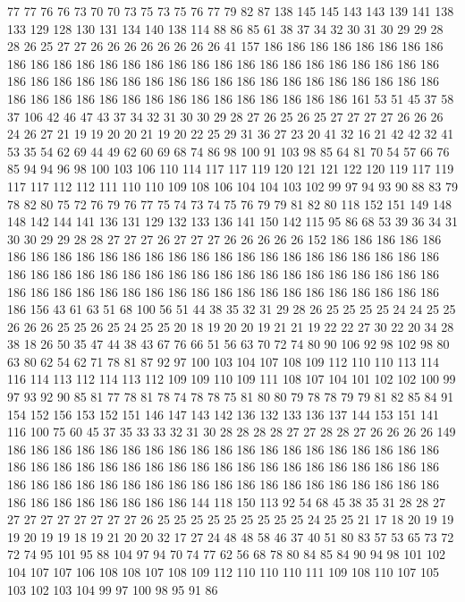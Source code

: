 77 77 76 76 73 70 70 73 75 73 75 76 77 79 82 87 138 145 145 143
143 139 141 138 133 129 128 130 131 134 140 138 114 88 86 85 61 38 37 34
32 30 31 30 29 29 28 28 26 25 27 27 26 26 26 26 26 26 26 26
41 157 186 186 186 186 186 186 186 186 186 186 186 186 186 186 186 186 186 186
186 186 186 186 186 186 186 186 186 186 186 186 186 186 186 186 186 186 186 186
186 186 186 186 186 186 186 186 186 186 186 186 186 186 186 186 186 186 186 186
186 186 186 161 53 51 45 37 58 37 106 42 46 47 43 37 34 32 31 30
30 29 28 27 26 25 26 25 27 27 27 27 26 26 26 24 26 27 21 19
19 20 20 21 19 20 22 25 29 31 36 27 23 20 41 32 16 21 42 42
32 41 53 35 54 62 69 44 49 62 60 69 68 74 86 98 100 91 103 98
85 64 81 70 54 57 66 76 85 94 94 96 98 100 103 106 110 114 117 117
119 120 121 121 122 120 119 117 119 117 117 112 112 111 110 110 109 108 106 104
104 103 102 99 97 94 93 90 88 83 79 78 82 80 75 72 76 79 76 77
75 74 73 74 75 76 79 79 81 82 80 118 152 151 149 148 148 142 144 141
136 131 129 132 133 136 141 150 142 115 95 86 68 53 39 36 34 31 30 30
29 29 28 28 27 27 27 26 27 27 27 26 26 26 26 26 152 186 186 186
186 186 186 186 186 186 186 186 186 186 186 186 186 186 186 186 186 186 186 186
186 186 186 186 186 186 186 186 186 186 186 186 186 186 186 186 186 186 186 186
186 186 186 186 186 186 186 186 186 186 186 186 186 186 186 186 186 186 186 186
156 43 61 63 51 68 100 56 51 44 38 35 32 31 29 28 26 25 25 25
25 24 24 25 25 26 26 26 25 25 26 25 24 25 25 20 18 19 20 20
19 21 21 19 22 22 27 30 22 20 34 28 38 18 26 50 35 47 44 38
43 67 76 66 51 56 63 70 72 74 80 90 106 92 98 102 98 80 63 80
62 54 62 71 78 81 87 92 97 100 103 104 107 108 109 112 110 110 113 114
116 114 113 112 114 113 112 109 109 110 109 111 108 107 104 101 102 102 100 99
97 93 92 90 85 81 77 78 81 78 74 78 78 75 81 80 80 79 78 78
79 79 81 82 85 84 91 154 152 156 153 152 151 146 147 143 142 136 132 133
136 137 144 153 151 141 116 100 75 60 45 37 35 33 33 32 31 30 28 28
28 28 27 27 28 28 27 26 26 26 26 149 186 186 186 186 186 186 186 186
186 186 186 186 186 186 186 186 186 186 186 186 186 186 186 186 186 186 186 186
186 186 186 186 186 186 186 186 186 186 186 186 186 186 186 186 186 186 186 186
186 186 186 186 186 186 186 186 186 186 186 186 186 186 186 186 186 144 118 150
113 92 54 68 45 38 35 31 28 28 27 27 27 27 27 27 27 27 27 26
25 25 25 25 25 25 25 25 25 24 25 25 21 17 18 20 19 19 19 20
19 19 18 19 21 20 20 32 17 27 24 48 48 58 46 37 40 51 80 83
57 53 65 73 72 72 74 95 101 95 88 104 97 94 70 74 77 62 56 68
78 80 84 85 84 90 94 98 101 102 104 107 107 106 108 108 107 108 109 112
110 110 110 111 109 108 110 107 105 103 102 103 104 99 97 100 98 95 91 86
